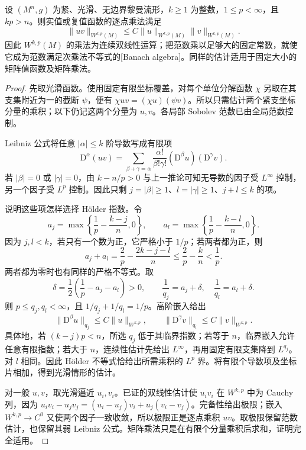 \begin{corollary}\label{g3:cor:sobolev-multiplication-algebra}
	设 \((M^n,g)\) 为紧、光滑、无边界黎曼流形，\(k\ge1\) 为整数，\(1\le p<\infty\)，且 \(kp>n\)。则实值或复值函数的逐点乘法满足
	\[
		\|uv\|_{W^{k,p}(M)}\le C\|u\|_{W^{k,p}(M)}\|v\|_{W^{k,p}(M)}.
	\]
	因此 \(W^{k,p}(M)\) 的乘法为连续双线性运算；把范数乘以足够大的固定常数，就使它成为范数满足次乘法不等式的[Banach algebra]。同样的估计适用于固定大小的矩阵值函数及矩阵乘法。
\end{corollary}
\begin{proof}
	先取光滑函数。使用固定有限坐标覆盖，对每个单位分解函数 \(\chi\) 另取在其支集附近为一的截断 \(\psi\)，便有 \(\chi uv=(\chi u)(\psi v)\)。所以只需估计两个紧支坐标分量的乘积；以下仍记这两个分量为 \(u,v\)。各局部 Sobolev 范数已由全局范数控制。

	Leibniz 公式将任意 \(|\alpha|\le k\) 阶导数写成有限项
	\[
		\mathrm D^\alpha(uv)
		=\sum_{\beta+\gamma=\alpha}\frac{\alpha!}{\beta!\gamma!}
		(\mathrm D^\beta u)(\mathrm D^\gamma v).
	\]
	若 \(|\beta|=0\) 或 \(|\gamma|=0\)，由 \(k-n/p>0\) 与上一推论可知无导数的因子受 \(L^\infty\) 控制，另一个因子受 \(L^p\) 控制。因此只剩 \(j=|\beta|\ge1\)、\(l=|\gamma|\ge1\)、\(j+l\le k\) 的项。

	说明这些项怎样选择 Hölder 指数。令
	\[
		a_j=\max\left\{\frac1p-\frac{k-j}{n},0\right\},\qquad
		a_l=\max\left\{\frac1p-\frac{k-l}{n},0\right\}.
	\]
	因为 \(j,l<k\)，若只有一个数为正，它严格小于 \(1/p\)；若两者都为正，则
	\[
		a_j+a_l=\frac2p-\frac{2k-j-l}{n}
		\le\frac2p-\frac kn<\frac1p.
	\]
	两者都为零时也有同样的严格不等式。取
	\[
		\delta=\frac12\left(\frac1p-a_j-a_l\right)>0,
		\qquad \frac1{q_j}=a_j+\delta,\quad \frac1{q_l}=a_l+\delta.
	\]
	则 \(p\le q_j,q_l<\infty\)，且 \(1/q_j+1/q_l=1/p\)。高阶嵌入给出
	\[
		\|\mathrm D^\beta u\|_{q_j}\le C\|u\|_{W^{k,p}},\qquad
		\|\mathrm D^\gamma v\|_{q_l}\le C\|v\|_{W^{k,p}}.
	\]
	具体地，若 \((k-j)p<n\)，所选 \(q_j\) 低于其临界指数；若等于 \(n\)，临界嵌入允许任意有限指数；若大于 \(n\)，连续性估计先给出 \(L^\infty\)，再用固定有限支集降到 \(L^{q_j}\)。对 \(l\) 相同。因此 Hölder 不等式恰给出所需乘积的 \(L^p\) 界。将有限个导数项及坐标片相加，得到光滑情形的估计。

	对一般 \(u,v\)，取光滑逼近 \(u_i,v_i\)。已证的双线性估计使 \(u_iv_i\) 在 \(W^{k,p}\) 中为 Cauchy 列，因为
	\(u_iv_i-u_jv_j=(u_i-u_j)v_i+u_j(v_i-v_j)\)。完备性给出极限；嵌入 \(W^{k,p}\to C^0\) 又使两个因子一致收敛，所以极限正是逐点乘积 \(uv\)。取极限保留范数估计，也保留其弱 Leibniz 公式。矩阵乘法只是在有限个分量乘积后求和，证明完全适用。
\end{proof}

